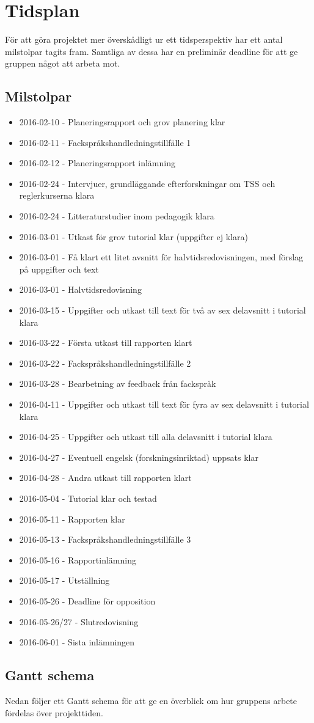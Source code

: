 \documentclass{article}
\begin{document}
\section{Tidsplan}
För att göra projektet mer överskådligt ur ett
tidsperspektiv har ett antal milstolpar tagits fram.
Samtliga av dessa har en preliminär deadline för
att ge gruppen något att arbeta mot.

\subsection{Milstolpar}
\begin{itemize}
 \item 2016-02-10 - Planeringsrapport och grov planering klar
 \item 2016-02-11 - Fackspråkshandledningstillfälle 1
 \item 2016-02-12 - Planeringsrapport inlämning
 \item 2016-02-24 - Intervjuer, grundläggande efterforskningar om TSS och reglerkurserna klara
 \item 2016-02-24 - Litteraturstudier inom pedagogik klara
 \item 2016-03-01 - Utkast för grov tutorial klar (uppgifter ej klara)
 \item 2016-03-01 - Få klart ett litet avsnitt för halvtidsredovisningen, med förslag på uppgifter och text
 \item 2016-03-01 - Halvtidsredovisning
 \item 2016-03-15 - Uppgifter och utkast till text för två av sex delavsnitt i tutorial klara
 \item 2016-03-22 - Första utkast till rapporten klart
 \item 2016-03-22 - Fackspråkshandledningstillfälle 2
 \item 2016-03-28 - Bearbetning av feedback från fackspråk
 \item 2016-04-11 - Uppgifter och utkast till text för fyra av sex delavsnitt i tutorial klara
 \item 2016-04-25 - Uppgifter och utkast till alla delavsnitt i tutorial klara
 \item 2016-04-27 - Eventuell engelsk (forskningsinriktad) uppsats klar
 \item 2016-04-28 - Andra utkast till rapporten klart
 \item 2016-05-04 - Tutorial klar och testad
 \item 2016-05-11 - Rapporten klar
 \item 2016-05-13 - Fackspråkshandledningstillfälle 3
 \item 2016-05-16 - Rapportinlämning
 \item 2016-05-17 - Utställning
 \item 2016-05-26 - Deadline för opposition
 \item 2016-05-26/27 - Slutredovisning
 \item 2016-06-01 - Sista inlämningen
\end{itemize}

\newpage
\subsection{Gantt schema}
Nedan följer ett Gantt schema för att ge en överblick om hur gruppens arbete fördelas över projekttiden.
\begin{figure}
    \centering
    
\end{figure}
\newpage

\printbibliography
\end{document}
